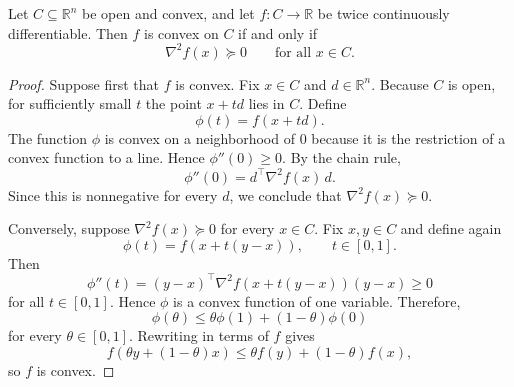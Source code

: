 \begin{theorem}\label{thm:l1-second-order-characterization}
	Let $C \subseteq \mathbb{R}^n$ be open and convex, and let $f:C \to \mathbb{R}$ be twice continuously differentiable. Then $f$ is convex on $C$ if and only if
	\[
		\nabla^2 f(x) \succeq 0
		\qquad \text{for all } x \in C.
	\]
\end{theorem}
\begin{proof}
	Suppose first that $f$ is convex. Fix $x \in C$ and $d \in \mathbb{R}^n$. Because $C$ is open, for sufficiently small $t$ the point $x+td$ lies in $C$. Define
	\[
		\phi(t) = f(x+td).
	\]
	The function $\phi$ is convex on a neighborhood of $0$ because it is the restriction of a convex function to a line. Hence $\phi''(0) \ge 0$. By the chain rule,
	\[
		\phi''(0) = d^\top \nabla^2 f(x)\, d.
	\]
	Since this is nonnegative for every $d$, we conclude that $\nabla^2 f(x) \succeq 0$.

	Conversely, suppose $\nabla^2 f(x) \succeq 0$ for every $x \in C$. Fix $x,y \in C$ and define again
	\[
		\phi(t) = f(x+t(y-x)), \qquad t \in [0,1].
	\]
	Then
	\[
		\phi''(t) = (y-x)^\top \nabla^2 f(x+t(y-x))(y-x) \ge 0
	\]
	for all $t \in [0,1]$. Hence $\phi$ is a convex function of one variable. Therefore,
	\[
		\phi(\theta) \le \theta \phi(1) + (1-\theta)\phi(0)
	\]
	for every $\theta \in [0,1]$. Rewriting in terms of $f$ gives
	\[
		f(\theta y + (1-\theta)x)
		\le \theta f(y) + (1-\theta)f(x),
	\]
	so $f$ is convex.
\end{proof}

